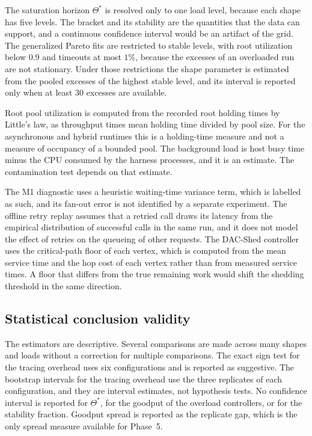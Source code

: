 The saturation horizon $\Theta^*$ is resolved only to one load level, because each shape has five levels. The bracket and its stability are the quantities that the data can support, and a continuous confidence interval would be an artifact of the grid. The generalized Pareto fits are restricted to stable levels, with root utilization below $0.9$ and timeouts at most $1\%$, because the excesses of an overloaded run are not stationary. Under those restrictions the shape parameter is estimated from the pooled excesses of the highest stable level, and its interval is reported only when at least 30 excesses are available.

Root pool utilization is computed from the recorded root holding times by Little's law, as throughput times mean holding time divided by pool size. For the asynchronous and hybrid runtimes this is a holding-time measure and not a measure of occupancy of a bounded pool. The background load is host busy time minus the CPU consumed by the harness processes, and it is an estimate. The contamination test depends on that estimate.

The M1 diagnostic uses a heuristic waiting-time variance term, which is labelled as such, and its fan-out error is not identified by a separate experiment. The offline retry replay assumes that a retried call draws its latency from the empirical distribution of successful calls in the same run, and it does not model the effect of retries on the queueing of other requests. The DAC-Shed controller uses the critical-path floor of each vertex, which is computed from the mean service time and the hop cost of each vertex rather than from measured service times. A floor that differs from the true remaining work would shift the shedding threshold in the same direction.

\subsection{Statistical conclusion validity}

The estimators are descriptive. Several comparisons are made across many shapes and loads without a correction for multiple comparisons. The exact sign test for the tracing overhead uses six configurations and is reported as suggestive. The bootstrap intervals for the tracing overhead use the three replicates of each configuration, and they are interval estimates, not hypothesis tests. No confidence interval is reported for $\Theta^*$, for the goodput of the overload controllers, or for the stability fraction. Goodput spread is reported as the replicate gap, which is the only spread measure available for Phase~5.

